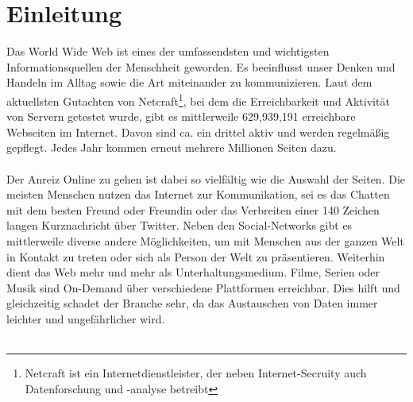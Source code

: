%
%
%
%


\chapter{Einleitung}

Das World Wide Web ist eines der umfassendsten und wichtigsten Informationsquellen der Menschheit geworden. Es beeinflusst unser Denken und Handeln im Alltag sowie die Art miteinander zu kommunizieren. Laut dem aktuellsten Gutachten\cite{websurvey} von Netcraft\footnote{Netcraft ist ein Internetdienstleister, der neben Internet-Secruity auch Datenforschung und -analyse betreibt}, bei dem die Erreichbarkeit und Aktivität von Servern getestet wurde, gibt es mittlerweile 629,939,191 erreichbare Webseiten im Internet. Davon sind ca. ein drittel aktiv und werden regelmäßig gepflegt. Jedes Jahr kommen erneut mehrere Millionen Seiten dazu.\\
\\
Der Anreiz \glqq Online zu gehen\grqq{} ist dabei so vielfältig wie die Auswahl der Seiten. Die meisten Menschen nutzen das Internet zur Kommunikation, sei es das Chatten mit dem besten Freund oder Freundin oder das Verbreiten einer 140 Zeichen langen Kurznachricht über Twitter. Neben den Social-Networks gibt es mittlerweile diverse andere Möglichkeiten, um mit Menschen aus der ganzen Welt in Kontakt zu treten oder sich als Person der Welt zu präsentieren. Weiterhin dient das Web mehr und mehr als Unterhaltungsmedium. Filme, Serien oder Musik sind \Gls{On-Demand} über verschiedene Plattformen erreichbar. Dies hilft und gleichzeitig schadet der Branche sehr, da das Austauschen von Daten immer leichter und ungefährlicher wird.\\
\\
